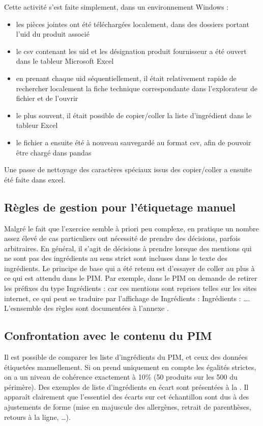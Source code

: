             Cette activité s'est faite simplement, dans un environnement Windows : 
            \begin{itemize}
                \item les pièces jointes ont été téléchargées localement, dans des dossiers portant l'uid du produit associé
                \item le csv contenant les uid et les désignation produit fournisseur a été ouvert dans le tableur Microsoft Excel
                \item en prenant chaque uid séquentiellement, il était relativement rapide de rechercher localement la fiche technique correspondante dans l'explorateur de fichier et de l'ouvrir
                \item le plus souvent, il était possible de copier/coller la liste d'ingrédient dans le tableur Excel
                \item le fichier a ensuite été à nouveau sauvegardé au format csv, afin de pouvoir être chargé dans pandas
            \end{itemize}
            Une passe de nettoyage des caractères spéciaux issus des copier/coller a ensuite été faite dans excel.

            \subsection{Règles de gestion pour l'étiquetage manuel}
        
            Malgré le fait que l'exercice semble à priori peu complexe, en pratique un nombre assez élevé de cas particuliers ont nécessité de prendre des décisions, parfois arbitraires.
            En général, il s'agit de décisions à prendre lorsque des mentions qui ne sont pas des ingrédients au sens strict sont incluses dans le texte des ingrédients.
            Le principe de base qui a été retenu est d'essayer de coller au plus à ce qui est attendu dans le PIM. 
            Par exemple, dans le PIM on demande de retirer les préfixes du type \og Ingrédients : \fg car ces mentions sont reprises telles sur les sites internet, ce qui peut se traduire par l'affichage de \og Ingrédients : Ingrédients : \dots \fg.
            L'esnsemble des règles sont documentées à l'annexe .

            \subsection{Confrontation avec le contenu du PIM}
            \label{ingredient_comparison}
            Il est possible de comparer les liste d'ingrédients du PIM, et ceux des données étiquetées manuellement.
            Si on prend uniquement en compte les égalités strictes, on a un niveau de cohérence exactement à 10\% (50 produits sur les 500 du périmère).
            Des exemples de liste d'ingrédients en écart sont présentées à la .
            Il apparaît clairement que l'essentiel des écarts sur cet échantillon sont dus à des ajustements de forme (mise en majuscule des allergènes, retrait de parenthèses, retours à la ligne, \dots).

